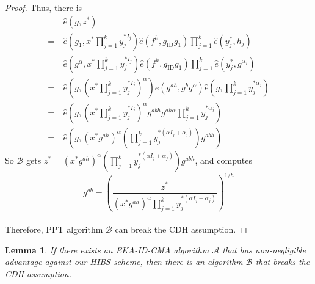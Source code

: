 \documentclass[times]{secauth}
\newtheorem{lemma}[theorem]{Lemma}
\theoremstyle{definition}
\theoremstyle{remark}
\begin{document}
\begin{proof}
Thus, there is 
\begin{align*}
&\hat{e}(g, z^*) \\
=~&\hat{e}(g_1, x^*\prod_{j=1}^k y_j^{*I_j})\hat{e}(f^h, g_{\mathrm{ID}}g_1)\prod_{j=1}^k \hat{e}(y_j^*, h_j)\\
=~&\hat{e}(g^\alpha, x^*\prod_{j=1}^k y_j^{*I_j}) \hat{e}(f^h, g_{\mathrm{ID}}g_1) \prod_{j=1}^k \hat{e}(y_j^*, g^{\alpha_j})\\
=~&\hat{e}(g, \left(x^*\prod_{j=1}^k y_j^{*I_j}\right)^\alpha)\hat{e}(g^{ah}, g^bg^\alpha) \hat{e}(g, \prod_{j=1}^k y_j^{*\alpha_j})\\
=~&\hat{e}(g, \left(x^*\prod_{j=1}^k y_j^{*I_j}\right)^\alpha g^{abh}g^{ah\alpha} \prod_{j=1}^k y_j^{*\alpha_j})\\
=~&\hat{e}(g, \left(x^*g^{ah}\right)^{\alpha}\left(\prod_{j=1}^k y_j^{*(\alpha I_j+\alpha_j)}\right) g^{abh})
\end{align*}
So $\mathcal{B}$ gets $z^* = \left(x^*g^{ah}\right)^{\alpha}\left(\prod_{j=1}^k y_j^{*(\alpha I_j+\alpha_j)}\right) g^{abh}$, and computes 
$$g^{ab} = \left(\frac{z^*}{\left(x^*g^{ah}\right)^{\alpha}\prod_{j=1}^k y_j^{*(\alpha I_j+\alpha_j)}}\right)^{1/h}$$
\vspace{0.2cm}
\\
Therefore, PPT algorithm $\mathcal{B}$ can break the CDH assumption.
\end{proof}

\begin{lemma} \label{lemma-eps-hibs}
If there exists an EKA-ID-CMA algorithm $\mathcal{A}$ that has non-negligible advantage against our HIBS scheme, 
then there is an algorithm $\mathcal{B}$ that breaks the CDH assumption.
\end{lemma}
\end{document}
